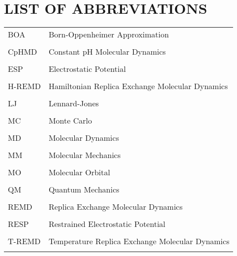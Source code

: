 
\chapter*{LIST OF ABBREVIATIONS}

\singlespacing

\begin{tabular}{lp{5in}}

BOA & Born-Oppenheimer Approximation \\ \\

CpHMD & Constant pH Molecular Dynamics \\ \\

ESP & Electrostatic Potential \\ \\

H-REMD & Hamiltonian Replica Exchange Molecular Dynamics \\ \\

LJ & Lennard-Jones \\ \\

MC & Monte Carlo \\ \\

MD & Molecular Dynamics \\ \\

MM & Molecular Mechanics \\ \\

MO & Molecular Orbital \\ \\

QM & Quantum Mechanics \\ \\

REMD & Replica Exchange Molecular Dynamics \\ \\

RESP & Restrained Electrostatic Potential \\ \\

T-REMD & Temperature Replica Exchange Molecular Dynamics \\ \\

\end{tabular}


